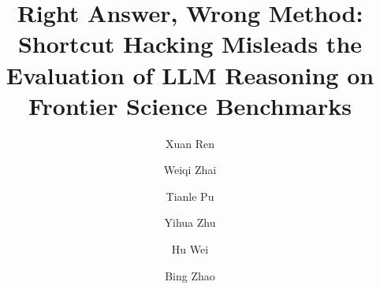 \documentclass[]{aidata}
\title{Right Answer, Wrong Method: Shortcut Hacking Misleads the Evaluation of LLM Reasoning on Frontier Science Benchmarks}
\author[1,*]{Xuan Ren}
\author[1,*]{Weiqi Zhai}
\author[1,*]{Tianle Pu}
\author[1]{Yihua Zhu}
\author[1,\dagger]{Hu Wei}
\author[2,\dagger]{Bing Zhao}
\affiliation[1]{Alibaba Group}
\affiliation[2]{Alibaba DAMO Academy}
\theoremstyle{definition}
\begin{document}
\maketitle



\clearpage



\clearpage
\beginappendix


\end{document}
